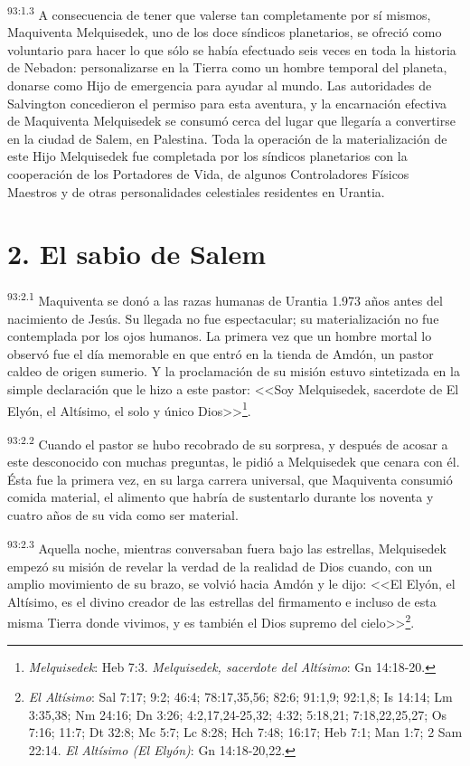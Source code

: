 \par
\textsuperscript{93:1.3} A consecuencia de tener que valerse tan completamente por sí mismos, Maquiventa Melquisedek, uno de los doce síndicos planetarios, se ofreció como voluntario para hacer lo que sólo se había efectuado seis veces en toda la historia de Nebadon: personalizarse en la Tierra como un hombre temporal del planeta, donarse como Hijo de emergencia para ayudar al mundo. Las autoridades de Salvington concedieron el permiso para esta aventura, y la encarnación efectiva de Maquiventa Melquisedek se consumó cerca del lugar que llegaría a convertirse en la ciudad de Salem, en Palestina. Toda la operación de la materialización de este Hijo Melquisedek fue completada por los síndicos planetarios con la cooperación de los Portadores de Vida, de algunos Controladores Físicos Maestros y de otras personalidades celestiales residentes en Urantia.

\section*{2. El sabio de Salem}
\par
\textsuperscript{93:2.1} Maquiventa se donó a las razas humanas de Urantia 1.973 años antes del nacimiento de Jesús. Su llegada no fue espectacular; su materialización no fue contemplada por los ojos humanos. La primera vez que un hombre mortal lo observó fue el día memorable en que entró en la tienda de Amdón, un pastor caldeo de origen sumerio. Y la proclamación de su misión estuvo sintetizada en la simple declaración que le hizo a este pastor: <<Soy Melquisedek, sacerdote de El Elyón, el Altísimo, el solo y único Dios>>\footnote{\textit{Melquisedek}: Heb 7:3. \textit{Melquisedek, sacerdote del Altísimo}: Gn 14:18-20.}.

\par
\textsuperscript{93:2.2} Cuando el pastor se hubo recobrado de su sorpresa, y después de acosar a este desconocido con muchas preguntas, le pidió a Melquisedek que cenara con él. Ésta fue la primera vez, en su larga carrera universal, que Maquiventa consumió comida material, el alimento que habría de sustentarlo durante los noventa y cuatro años de su vida como ser material.

\par
\textsuperscript{93:2.3} Aquella noche, mientras conversaban fuera bajo las estrellas, Melquisedek empezó su misión de revelar la verdad de la realidad de Dios cuando, con un amplio movimiento de su brazo, se volvió hacia Amdón y le dijo: <<El Elyón, el Altísimo, es el divino creador de las estrellas del firmamento e incluso de esta misma Tierra donde vivimos, y es también el Dios supremo del cielo>>\footnote{\textit{El Altísimo}: Sal 7:17; 9:2; 46:4; 78:17,35,56; 82:6; 91:1,9; 92:1,8; Is 14:14; Lm 3:35,38; Nm 24:16; Dn 3:26; 4:2,17,24-25,32; 4:32; 5:18,21; 7:18,22,25,27; Os 7:16; 11:7; Dt 32:8; Mc 5:7; Lc 8:28; Hch 7:48; 16:17; Heb 7:1; Man 1:7; 2 Sam 22:14. \textit{El Altísimo (El Elyón)}: Gn 14:18-20,22.}.

